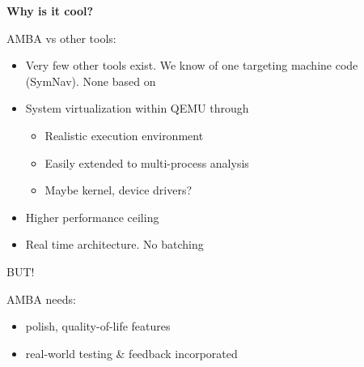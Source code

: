 \begin{frame}


	\textbf{Why is it cool?}
	\vspace{1.8mm}

	AMBA vs other tools:
    \pause{}

	\begin{itemize}

		\item Very few other tools exist. We know of one targeting machine code
		      (SymNav). None based on \stoe{}
        \pause{}

		\item System virtualization within QEMU through \stoe{}
		      \begin{itemize}

			      \item Realistic execution environment

			      \item Easily extended to multi-process analysis

			      \item Maybe kernel, device drivers?

		      \end{itemize}
        \pause{}

		\item Higher performance ceiling
        \pause{}

		\item Real time architecture. No batching

	\end{itemize}

	\pause{}
	BUT!

	\pause{}
	AMBA needs:
	\begin{itemize}
		\item polish, quality-of-life features

		\item real-world testing \& feedback incorporated

	\end{itemize}

\end{frame}
